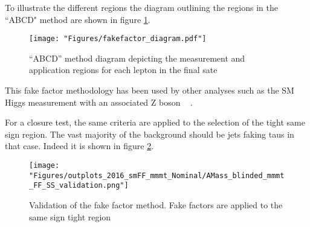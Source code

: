 To illustrate the different regions the diagram outlining the regions in the ``ABCD" method are shown in figure \ref{fig:fakefactor_reg}. 
\begin{figure}[ht!b]
  \texttt{[image: "Figures/fakefactor\_diagram.pdf"]}
    \caption{\label{fig:fakefactor_reg} ``ABCD'' method diagram depicting the measurement and application regions for each \tauh lepton in the final sate}
\end{figure}

This fake factor methodology has been used by other analyses such as the SM Higgs measurement with an associated Z boson ~\cite{CMS-PAS-HIG-19-010} . 

For a closure test, the same criteria are applied to the selection of the tight same sign region. The vast majority of the background should be jets faking taus in that case. Indeed it is shown in figure \ref{fig:fakefactor_validation}.
  
\begin{figure}[ht!b]
  \texttt{[image: "Figures/outplots\_2016\_smFF\_mmmt\_Nominal/AMass\_blinded\_mmmt\_FF\_SS\_validation.png"]}
    \caption{\label{fig:fakefactor_validation} Validation of the fake factor method. Fake factors are applied to the same sign tight region}
\end{figure}
